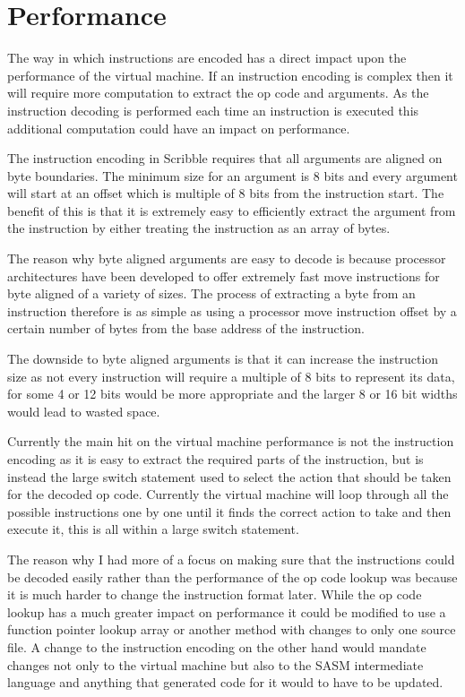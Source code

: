 \documentclass[]{final_report}
\begin{document}
\section{Performance}

The way in which instructions are encoded has a direct impact upon the performance of the virtual machine. If an instruction encoding is complex then it will require more computation to extract the op code and arguments. As the instruction decoding is performed each time an instruction is executed this additional computation could have an impact on performance.

The instruction encoding in Scribble requires that all arguments are aligned on byte boundaries. The minimum size for an argument is 8 bits and every argument will start at an offset which is multiple of 8 bits from the instruction start. The benefit of this is that it is extremely easy to efficiently extract the argument from the instruction by either treating the instruction as an array of bytes.

The reason why byte aligned arguments are easy to decode is because processor architectures have been developed to offer extremely fast move instructions for byte aligned of a variety of sizes. The process of extracting a byte from an instruction therefore is as simple as using a processor move instruction offset by a certain number of bytes from the base address of the instruction.

The downside to byte aligned arguments is that it can increase the instruction size as not every instruction will require a multiple of 8 bits to represent its data, for some 4 or 12 bits would be more appropriate and the larger 8 or 16 bit widths would lead to wasted space.

Currently the main hit on the virtual machine performance is not the instruction encoding as it is easy to extract the required parts of the instruction, but is instead the large switch statement used to select the action that should be taken for the decoded op code. Currently the virtual machine will loop through all the possible instructions one by one until it finds the correct action to take and then execute it, this is all within a large switch statement.

The reason why I had more of a focus on making sure that the instructions could be decoded easily rather than the performance of the op code lookup was because it is much harder to change the instruction format later. While the op code lookup has a much greater impact on performance it could be modified to use a function pointer lookup array or another method with changes to only one source file. A change to the instruction encoding on the other hand would mandate changes not only to the virtual machine but also to the SASM intermediate language and anything that generated code for it would to have to be updated.
\end{document}
